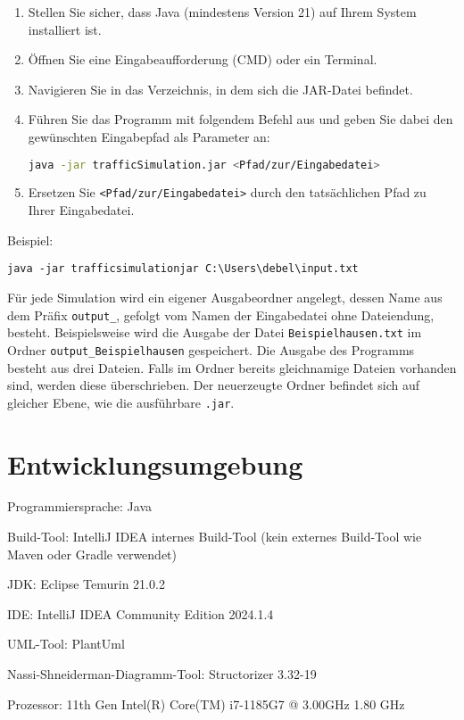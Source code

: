 \documentclass[a4paper,12pt]{report}
\begin{document}
\begin{enumerate}
    \item Stellen Sie sicher, dass Java (mindestens Version 21) auf Ihrem System installiert ist.
    \item Öffnen Sie eine Eingabeaufforderung (CMD) oder ein Terminal.
    \item Navigieren Sie in das Verzeichnis, in dem sich die JAR-Datei befindet.
    \item Führen Sie das Programm mit folgendem Befehl aus und geben Sie dabei den gewünschten Eingabepfad als Parameter an:
    \begin{lstlisting}[language=bash]
    java -jar trafficSimulation.jar <Pfad/zur/Eingabedatei>
    \end{lstlisting}
    \item Ersetzen Sie \texttt{<Pfad/zur/Eingabedatei>} durch den tatsächlichen Pfad zu Ihrer Eingabedatei.
\end{enumerate}

Beispiel:


\texttt{java -jar trafficsimulationjar C:\textbackslash Users\textbackslash debel\textbackslash input.txt}

Für jede Simulation wird ein eigener Ausgabeordner angelegt,
dessen Name aus dem Präfix \texttt{output\_},
gefolgt vom Namen der Eingabedatei ohne Dateiendung, besteht. 
Beispielsweise wird die Ausgabe der Datei \texttt{Beispielhausen.txt} im Ordner \texttt{output\_Beispielhausen} gespeichert. 
Die Ausgabe des Programms besteht aus drei Dateien. 
Falls im Ordner bereits gleichnamige Dateien vorhanden sind, werden diese überschrieben.
Der neuerzeugte Ordner befindet sich auf gleicher Ebene, wie die ausführbare \texttt{.jar}.



\chapter{Entwicklungsumgebung}
Programmiersprache: Java

Build-Tool: IntelliJ IDEA internes Build-Tool (kein externes Build-Tool wie Maven oder Gradle verwendet)

JDK: Eclipse Temurin 21.0.2

IDE: IntelliJ IDEA Community Edition 2024.1.4

UML-Tool: PlantUml

Nassi-Shneiderman-Diagramm-Tool: Structorizer 3.32-19

Prozessor: 11th Gen Intel(R) Core(TM) i7-1185G7 @ 3.00GHz   1.80 GHz 
\end{document}
